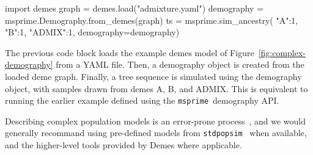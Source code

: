 \documentclass[graybox]{svmult}
\newcommand{\msprime}[0]{\texttt{msprime}}
\begin{document}
\begin{pythoncode}
import demes
graph = demes.load("admixture.yaml")
demography = msprime.Demography.from_demes(graph)
ts = msprime.sim_ancestry(
    {"A":1, "B":1, "ADMIX":1},
    demography=demography)
\end{pythoncode}

The previous code block loads the example demes model of
Figure~\ref{fig:complex-demography} from a YAML file. Then, a demography object
is created from the loaded deme graph. Finally, a tree sequence is simulated using the
demography object, with samples drawn from demes A, B, and ADMIX. This is
equivalent to running the earlier example defined using the \msprime\
demography API.

Describing complex population models is an error-prone
process~\citep{ragsdale2020lessons}, and we would generally recommand using
pre-defined models from \texttt{stdpopsim}~\citep{
adrion2020stdpopsim,lauterbur2023expanding,gower2025accessible} when available,
and the higher-level tools provided by Demes where applicable.



\end{document}
